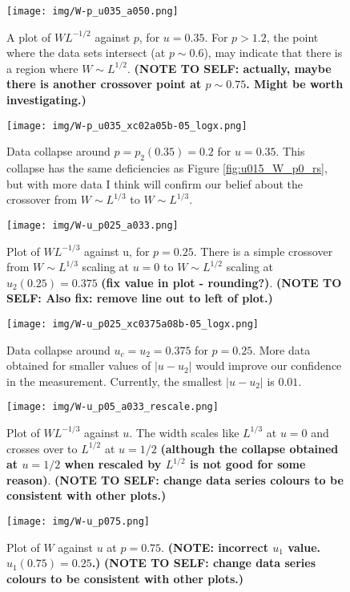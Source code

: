 \documentclass[a4paper,10pt]{article}
\newcommand{\fref}[1]{Figure \ref{#1}}
\begin{document}
\begin{figure}
 \centering
 \texttt{[image: img/W-p\_u035\_a050.png]}
 \caption{A plot of $WL^{-1/2}$ against $p$, for $u = 0.35$. For $p > 1.2$, the point where the data sets intersect (at $p \sim 0.6$), may indicate that there is a region where $W \sim L^{1/2}$. {\bf (NOTE TO SELF: actually, maybe there is another crossover point at $p \sim 0.75$. Might be worth investigating.)}}
 \label{fig:W-p_u035_a050}
\end{figure}
\begin{figure}
 \centering
 \texttt{[image: img/W-p\_u035\_xc02a05b-05\_logx.png]}
 \caption{Data collapse around $p = p_2(0.35) = 0.2$ for $u=0.35$. This collapse has the same deficiencies as \fref{fig:u015_W_p0_rs}, but with more data I think will confirm our belief about the crossover from $W\sim L^{1/3}$ to $W\sim L^{1/3}$.}
 \label{fig:W-p_u035_rs}
\end{figure}
\begin{figure}
 \centering 
 \texttt{[image: img/W-u\_p025\_a033.png]}
 \caption{Plot of $WL^{-1/3}$ against u, for $p=0.25$. There is a simple crossover from $W\sim L^{1/3}$ scaling at $u = 0$ to $W\sim L^{1/2}$ scaling at $u_2(0.25) = 0.375$ {\bf (fix value in plot - rounding?)}. {\bf (NOTE TO SELF: Also fix: remove line out to left of plot.)}}
 \label{fig:W-u_p025_a033}
\end{figure}
\begin{figure}
 \centering
 \texttt{[image: img/W-u\_p025\_xc0375a08b-05\_logx.png]}
 \caption{Data collapse around $u_c = u_2 = 0.375$ for $p=0.25$. More data obtained for smaller values of $|u-u_2|$ would improve our confidence in the measurement. Currently, the smallest $|u-u_2|$ is $0.01$.}
 \label{fig:W-u_p025_rs}
\end{figure}
\begin{figure}
 \centering
 \texttt{[image: img/W-u\_p05\_a033\_rescale.png]}
 \caption{Plot of $WL^{-1/3}$ against $u$. The width scales like $L^{1/3}$ at $u=0$ and crosses over to $L^{1/2}$ at $u = 1/2$ {\bf (although the collapse obtained at $u=1/2$ when rescaled by $L^{1/2}$ is not good for some reason)}. {\bf (NOTE TO SELF: change data series colours to be consistent with other plots.)}}
 \label{fig:W-u_p05_a033}
\end{figure}
\begin{figure}
 \centering
 \texttt{[image: img/W-u\_p075.png]}
 \caption{Plot of $W$ against $u$ at $p=0.75$. {\bf (NOTE: incorrect $u_1$ value. $u_1(0.75) = 0.25$.)} {\bf (NOTE TO SELF: change data series colours to be consistent with other plots.)}}
\end{figure}
\end{document}
